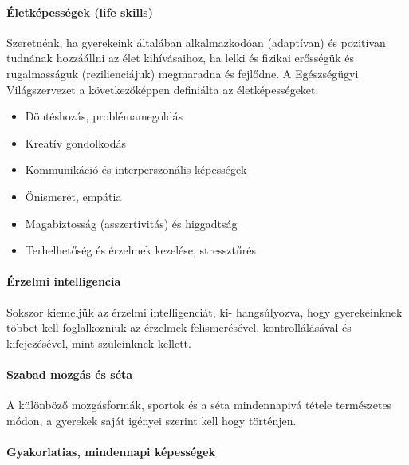 \paragraph{Életképességek (life skills)}

Szeretnénk, ha gyerekeink általában alkalmazkodóan (adaptívan) és pozitívan tudnának hozzáállni az élet kihívásaihoz, ha lelki és fizikai erősségük és rugalmasságuk (rezilienciájuk) megmaradna és fejlődne.	 A Egészségügyi Világszervezet \citep{oecd99lifeskills} a következőképpen definiálta  az életképességeket:
\begin{itemize}
  \item Döntéshozás, problémamegoldás

  \item Kreatív gondolkodás

  \item Kommunikáció és interperszonális képességek

  \item Önismeret, empátia

  \item Magabiztosság (asszertivitás) és higgadtság

  \item Terhelhetőség és érzelmek kezelése, stressztűrés
\end{itemize}
\paragraph{Érzelmi intelligencia}

Sokszor kiemeljük az érzelmi intelligenciát, ki-\linebreak
hang\-sú\-lyoz\-va, hogy gyerekeinknek többet kell foglalkozniuk az érzelmek felismerésével, kontrollálásával és kifejezésével, mint szüleinknek kellett.

\paragraph{Szabad mozgás és séta}

A különböző mozgásformák, sportok és a séta\linebreak
mindennapivá tétele természetes módon, a gyerekek saját igényei szerint kell hogy történjen.

\paragraph{Gyakorlatias, mindennapi képességek}

